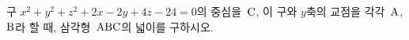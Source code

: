 구 $x^2+y^2+z^2+2x-2y+4z-24=0$의 중심을~$\mathrm{C}$, 이 구와 $y$축의 교점을 각각~$\mathrm{A}$, $\mathrm{B}$라 할 때, 삼각형~$\mathrm{ABC}$의 넓이를 구하시오.
